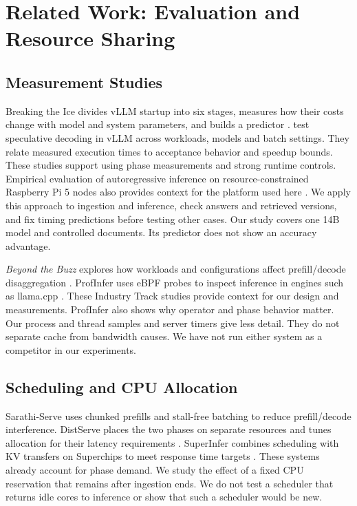 \section{Related Work: Evaluation and Resource Sharing}
\subsection{Measurement Studies}
Breaking the Ice divides vLLM startup into six stages, measures how their costs
change with model and system parameters, and builds a predictor
\citep{breakingice}. \citet{specillusion} test speculative decoding in vLLM
across workloads, models and batch settings. They relate measured execution
times to acceptance behavior and speedup bounds. These studies support using
phase measurements and strong runtime controls. Empirical evaluation of
autoregressive inference on resource-constrained Raspberry Pi 5 nodes also
provides context for the platform used here \citep{daian2026rpi}.
We apply this approach to
ingestion and inference, check answers and retrieved versions, and fix timing
predictions before testing other cases. Our study covers one 14B model and
controlled documents. Its predictor does not show an accuracy advantage.

\emph{Beyond the Buzz} explores how workloads and configurations affect
prefill/decode disaggregation \citep{beyondbuzz}. ProfInfer uses eBPF probes to
inspect inference in engines such as llama.cpp \citep{profinfer}. These Industry
Track studies provide context for our design and measurements. ProfInfer also
shows why operator and phase behavior matter. Our process and thread samples
and server timers give less detail. They do not separate cache from bandwidth
causes. We have not run either system as a competitor in our experiments.

\subsection{Scheduling and CPU Allocation}
Sarathi-Serve uses chunked prefills and stall-free batching to reduce
prefill/decode interference. DistServe places the two phases on separate
resources and tunes allocation for their latency requirements
\citep{sarathi,distserve}. SuperInfer combines scheduling with KV transfers on
Superchips to meet response time targets \citep{superinfer}. These systems
already account for phase demand. We study the effect of a fixed CPU reservation
that remains after ingestion ends. We do not test a scheduler that returns
idle cores to inference or show that such a scheduler would be new.

